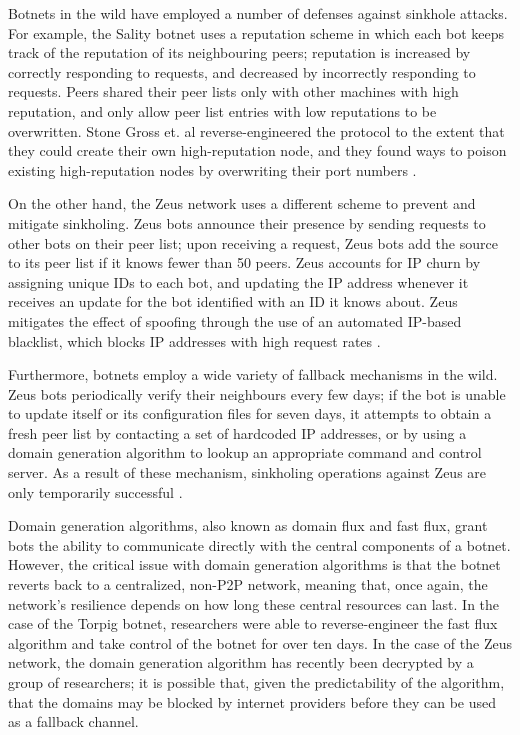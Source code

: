 \documentclass{acm_proc_article-sp}
\begin{document}
Botnets in the wild have employed a number of defenses against sinkhole attacks.  For example, the Sality botnet uses a reputation scheme in which each bot keeps track of the reputation of its neighbouring peers; reputation is increased by correctly responding to requests, and decreased by incorrectly responding to requests. Peers shared their peer lists only with other machines with high reputation, and only allow peer list entries with low reputations to be overwritten. Stone Gross et. al reverse-engineered the protocol to the extent that they could create their own high-reputation node, and they found ways to poison existing high-reputation nodes by overwriting their port numbers \cite{stone:p2p}.

On the other hand, the Zeus network uses a different scheme to prevent and mitigate sinkholing. Zeus bots announce their presence by sending requests to other bots on their peer list; upon receiving a request, Zeus bots add the source to its peer list if it knows fewer than 50 peers.  Zeus accounts for IP churn by assigning unique IDs to each bot, and updating the IP address whenever it receives an update for the bot identified with an ID it knows about.  Zeus mitigates the effect of spoofing through the use of an automated IP-based blacklist, which blocks IP addresses with high request rates \cite{stone:p2p}.

Furthermore, botnets employ a wide variety of fallback mechanisms in the wild.  Zeus bots periodically verify their neighbours every few days; if the bot is unable to update itself or its configuration files for seven days, it attempts to obtain a fresh peer list by contacting a set of hardcoded IP addresses, or by using a domain generation algorithm to lookup an appropriate command and control server.  As a result of these mechanism, sinkholing operations against Zeus are only temporarily successful \cite{stone:p2p}.

Domain generation algorithms, also known as domain flux and fast flux, grant bots the ability to communicate directly with the central components of a botnet.  However, the critical issue with domain generation algorithms is that the botnet reverts back to a centralized, non-P2P network, meaning that, once again, the network's resilience depends on how long these central resources can last.  In the case of the Torpig botnet, researchers were able to reverse-engineer the fast flux algorithm and take control of the botnet for over ten days\cite{stone:takeover}.  In the case of the Zeus network, the domain generation algorithm has recently been decrypted by a group of researchers; it is possible that, given the predictability of the algorithm, that the domains may be blocked by internet providers before they can be used as a fallback channel\cite{zeus:protocol}.
\end{document}
